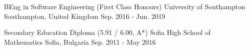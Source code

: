 

\begin{cventries}

  \cventry
    {BEng in Software Engineering (First Class Honours)}
    {University of Southampton}
    {Southampton, United Kingdom}
    {Sep. 2016 - Jun. 2019}
    {
    }

  \cventry
    {Secondary Education Diploma (5.91 / 6.00, A*)}
    {Sofia High School of Mathematics}
    {Sofia, Bulgaria}
    {Sep. 2011 - May 2016}
    {
    }

\end{cventries}
